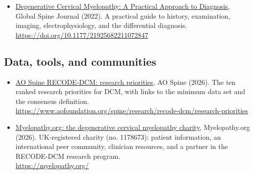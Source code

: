 \documentclass[11pt, letterpaper]{article}
\begin{document}
\begin{itemize}
        \\ {\small\url{https://doi.org/10.3390/jcm11185386}}
  \item \href{https://doi.org/10.1177/21925682211072847}{Degenerative Cervical Myelopathy: A Practical Approach to Diagnosis}, Global Spine Journal (2022). A practical guide to history, examination, imaging, electrophysiology, and the differential diagnosis.
        \\ {\small\url{https://doi.org/10.1177/21925682211072847}}
\end{itemize}

\subsection*{Data, tools, and communities}
\begin{itemize}
  \item \href{https://www.aofoundation.org/spine/research/recode-dcm/research-priorities}{AO Spine RECODE-DCM: research priorities}, AO Spine (2026). The ten ranked research priorities for DCM, with links to the minimum data set and the consensus definition.
        \\ {\small\url{https://www.aofoundation.org/spine/research/recode-dcm/research-priorities}}
  \item \href{https://myelopathy.org/}{Myelopathy.org: the degenerative cervical myelopathy charity}, Myelopathy.org (2026). UK-registered charity (no. 1178673): patient information, an international peer community, clinician resources, and a partner in the RECODE-DCM research program.
        \\ {\small\url{https://myelopathy.org/}}
\end{itemize}

\nocite{myelopathyorg,aorecode}
\printbibliography[heading=subbibintoc, title={Works cited}]

\bigskip{}


\printnoidxglossary[sort=word, title={Glossary}]   %
\end{document}
